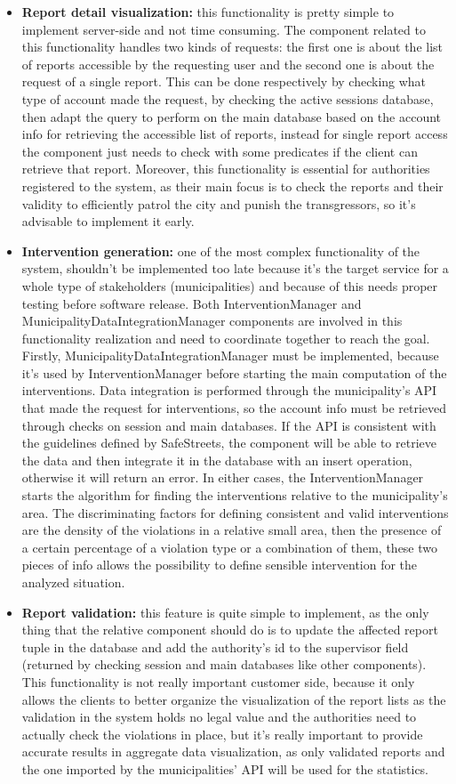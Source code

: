 \begin{itemize}
	\item \textbf{Report detail visualization:} this functionality is pretty simple to implement server-side and not time consuming. The component related to this functionality handles two kinds of requests: the first one is about the list of reports accessible by the requesting user and the second one is about the request of a single report. This can be done respectively by checking what type of account made the request, by checking the active sessions database, then adapt the query to perform on the main database based on the account info for retrieving the accessible list of reports, instead for single report access the component just needs to check with some predicates if the client can retrieve that report. Moreover, this functionality is essential for authorities registered to the system, as their main focus is to check the reports and their validity to efficiently patrol the city and punish the transgressors, so it's advisable to implement it early.
	\item \textbf{Intervention generation:} one of the most complex functionality of the system, shouldn't be implemented too late because it's the target service for a whole type of stakeholders (municipalities) and because of this needs proper testing before software release. Both InterventionManager and MunicipalityDataIntegrationManager components are involved in this functionality realization and need to coordinate together to reach the goal. Firstly, MunicipalityDataIntegrationManager must be implemented, because it's used by InterventionManager before starting the main computation of the interventions. Data integration is performed through the municipality's API that made the request for interventions, so the account info must be retrieved through checks on session and main databases. If the API is consistent with the guidelines defined by SafeStreets, the component will be able to retrieve the data and then integrate it in the database with an insert operation, otherwise it will return an error. In either cases, the InterventionManager starts the algorithm for finding the interventions relative to the municipality's area. The discriminating factors for defining consistent and valid interventions are the density of the violations in a relative small area, then the presence of a certain percentage of a violation type or a combination of them, these two pieces of info allows the possibility to define sensible intervention for the analyzed situation.
	\item \textbf{Report validation:} this feature is quite simple to implement, as the only thing that the relative component should do is to update the affected report tuple in the database and add the authority's id to the supervisor field (returned by checking session and main databases like other components). This functionality is not really important customer side, because it only allows the clients to better organize the visualization of the report lists as the validation in the system holds no legal value and the authorities need to actually check the violations in place, but it's really important to provide accurate results in aggregate data visualization, as only validated reports and the one imported by the municipalities' API will be used for the statistics.

\end{itemize}
